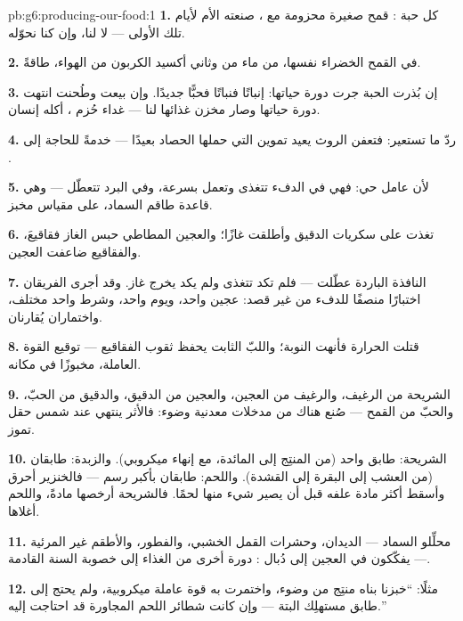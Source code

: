 \begin{solution}{pb:g6:producing-our-food:1}
\textbf{1.} كل حبة :  قمح صغيرة محزومة مع ،
صنعته الأم لأيام تلك  الأولى --- لا لنا، وإن كنا نحوّله.

\textbf{2.} في   القمح الخضراء نفسها، من ماء  من  وثاني أكسيد الكربون من الهواء،  طاقةً.

\textbf{3.} إن بُذرت الحبة جرت دورة حياتها: إنباتًا فنباتًا فحبًّا
جديدًا. وإن بيعت وطُحنت انتهت دورة حياتها وصار مخزن غذائها لنا ---
غداء حُزم ، أكله إنسان.

\textbf{4.} ردّ ما تستعير: فتعفن الروث يعيد تموين 
التي حملها الحصاد بعيدًا --- خدمةً للحاجة إلى .

\textbf{5.} لأن  عامل حي: فهي في الدفء تتغذى وتعمل بسرعة،
وفي البرد تتعطّل --- وهي قاعدة طاقم السماد، على مقياس مخبز.

\textbf{6.} تغذت على سكريات الدقيق وأطلقت غازًا؛ والعجين المطاطي
حبس الغاز فقاقيعَ، والفقاقيع ضاعفت العجين.

\textbf{7.} النافذة الباردة عطّلت  --- فلم تكد تتغذى ولم
يكد يخرج غاز. وقد أجرى الفريقان اختبارًا منصفًا للدفء من غير قصد:
عجين واحد، ويوم واحد، وشرط واحد مختلف، واختماران يُقارنان.

\textbf{8.} قتلت الحرارة  فأنهت النوبة؛ واللبّ الثابت يحفظ
ثقوب الفقاقيع --- توقيع القوة العاملة، مخبوزًا في مكانه.

\textbf{9.} الشريحة من الرغيف، والرغيف من العجين، والعجين من
الدقيق، والدقيق من الحبّ، والحبّ من   القمح --- صُنع
هناك من مدخلات معدنية وضوء: فالأثر ينتهي عند شمس حقل تموز.

\textbf{10.} الشريحة: طابق واحد (من المنتِج إلى المائدة، مع إنهاء
ميكروبي). والزبدة: طابقان (من العشب إلى البقرة إلى القشدة).
واللحم: طابقان بأكبر رسم --- فالخنزير أحرق وأسقط أكثر مادة علفه
قبل أن يصير شيء منها لحمًا. فالشريحة أرخصها مادةً، واللحم أغلاها.

\textbf{11.} محلِّلو السماد --- الديدان، وحشرات القمل الخشبي،
والفطور، والأطقم غير المرئية --- يفكّكون  في العجين
إلى دُبال : دورة أخرى من الغذاء إلى خصوبة  السنة
القادمة.

\textbf{12.} مثلًا: ``خبزنا بناه منتِج من  وضوء،
واختمرت به قوة عاملة ميكروبية، ولم يحتج إلى طابق مستهلِك البتة ---
وإن كانت شطائر اللحم المجاورة قد احتاجت إليه.''
\end{solution}
